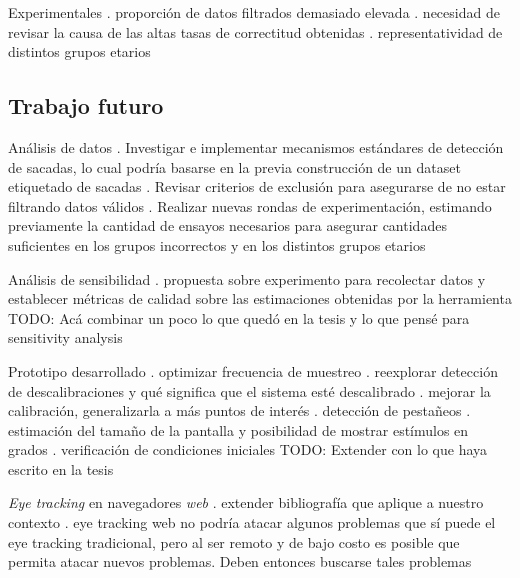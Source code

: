 \documentclass[aspectratio=169]{beamer}
\begin{document}
\begin{frame}{Experimentales}
. proporción de datos filtrados demasiado elevada
. necesidad de revisar la causa de las altas tasas de correctitud obtenidas
. representatividad de distintos grupos etarios
\end{frame}

\subsection{Trabajo futuro}

\begin{frame}{Análisis de datos}
. Investigar e implementar mecanismos estándares de detección de sacadas, lo
  cual podría basarse en la previa construcción de un dataset etiquetado de
  sacadas
. Revisar criterios de exclusión para asegurarse de no estar filtrando datos
  válidos
. Realizar nuevas rondas de experimentación, estimando previamente la cantidad
  de ensayos necesarios para asegurar cantidades suficientes en los grupos
  incorrectos y en los distintos grupos etarios
\end{frame}

\begin{frame}{Análisis de sensibilidad}
. propuesta sobre experimento para recolectar datos y establecer métricas de
  calidad sobre las estimaciones obtenidas por la herramienta
TODO: Acá combinar un poco lo que quedó en la tesis y lo que pensé para
      sensitivity analysis
\end{frame}

\begin{frame}{Prototipo desarrollado}
. optimizar frecuencia de muestreo
. reexplorar detección de descalibraciones y qué significa que el sistema esté
  descalibrado
. mejorar la calibración, generalizarla a más puntos de interés
. detección de pestañeos
. estimación del tamaño de la pantalla y posibilidad de mostrar estímulos en
  grados
. verificación de condiciones iniciales
TODO: Extender con lo que haya escrito en la tesis
\end{frame}

\begin{frame}{\textit{Eye tracking} en navegadores \textit{web}}
. extender bibliografía que aplique a nuestro contexto
. eye tracking web no podría atacar algunos problemas que sí puede el eye
  tracking tradicional, pero al ser remoto y de bajo costo es posible que
  permita atacar nuevos problemas. Deben entonces buscarse tales problemas
\end{frame}
\end{document}
